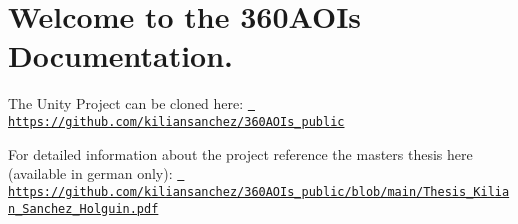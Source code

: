 \chapter{Welcome to the 360AOIs Documentation.}
\hypertarget{index}{}\label{index}
\label{index_md_mainpage}%
%
 The Unity Project can be cloned here\+: \href{https://github.com/kiliansanchez/360AOIs_public}{\texttt{ https\+://github.\+com/kiliansanchez/360\+AOIs\+\_\+public}}

For detailed information about the project reference the master\textquotesingle{}s thesis here (available in german only)\+: \href{https://github.com/kiliansanchez/360AOIs_public/blob/main/Thesis_Kilian_Sanchez_Holguin.pdf}{\texttt{ https\+://github.\+com/kiliansanchez/360\+AOIs\+\_\+public/blob/main/\+Thesis\+\_\+\+Kilian\+\_\+\+Sanchez\+\_\+\+Holguin.\+pdf}} 